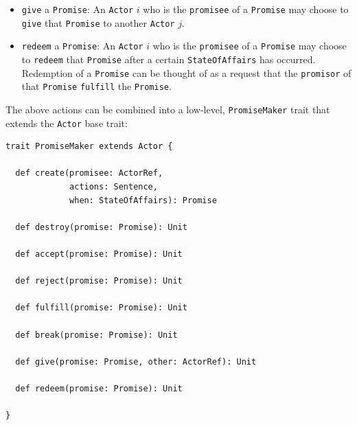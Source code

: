 \documentclass[a4paper]{article}
\begin{document}
\begin{itemize}
	\item \texttt{give} a \texttt{Promise}: An \texttt{Actor} $i$ who is the \texttt{promisee} of a \texttt{Promise} may choose to \texttt{give} that \texttt{Promise} to another \texttt{Actor} $j$.
	\item \texttt{redeem} a \texttt{Promise}:  An \texttt{Actor} $i$ who is the \texttt{promisee} of a \texttt{Promise} may choose to \texttt{redeem} that \texttt{Promise} after a certain \texttt{StateOfAffairs} has occurred. Redemption of a \texttt{Promise} can be thought of as a request that the \texttt{promisor} of that \texttt{Promise} \texttt{fulfill} the \texttt{Promise}.
\end{itemize}

The above actions can be combined into a low-level, \texttt{PromiseMaker} trait that extends the \texttt{Actor} base trait:
\begin{verbatim}
trait PromiseMaker extends Actor {
  
  def create(promisee: ActorRef,
             actions: Sentence,
             when: StateOfAffairs): Promise
  
  def destroy(promise: Promise): Unit
  
  def accept(promise: Promise): Unit
  
  def reject(promise: Promise): Unit
  
  def fulfill(promise: Promise): Unit
  
  def break(promise: Promise): Unit
  
  def give(promise: Promise, other: ActorRef): Unit
  
  def redeem(promise: Promise): Unit
  
}
\end{verbatim}
\end{document}
